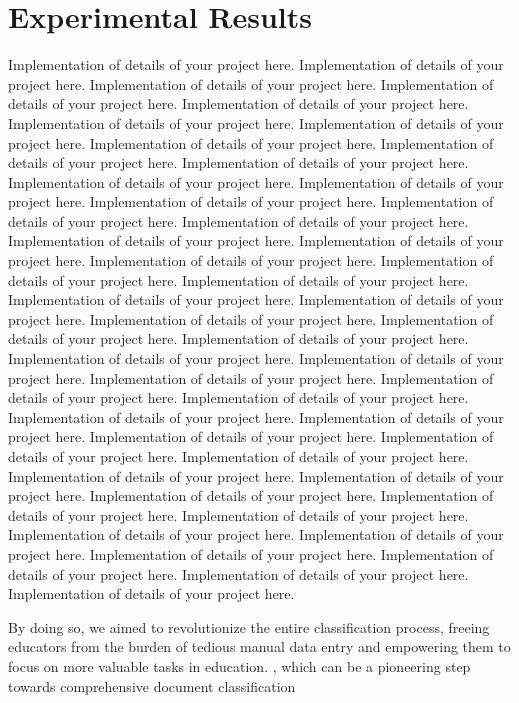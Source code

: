 \chapter{Experimental Results}


Implementation of details of  your project here. Implementation of details of  your project here. Implementation of details of  your project here. Implementation of details of  your project here. Implementation of details of  your project here. Implementation of details of  your project here. Implementation of details of  your project here. Implementation of details of  your project here. Implementation of details of  your project here. Implementation of details of  your project here. Implementation of details of  your project here. Implementation of details of  your project here. Implementation of details of  your project here. Implementation of details of  your project here. Implementation of details of  your project here. Implementation of details of  your project here. Implementation of details of  your project here. Implementation of details of  your project here. Implementation of details of  your project here. Implementation of details of  your project here. Implementation of details of  your project here. Implementation of details of  your project here. Implementation of details of  your project here. Implementation of details of  your project here. Implementation of details of  your project here. Implementation of details of  your project here. Implementation of details of  your project here. Implementation of details of  your project here. Implementation of details of  your project here. Implementation of details of  your project here. Implementation of details of  your project here. Implementation of details of  your project here. Implementation of details of  your project here. Implementation of details of  your project here. Implementation of details of  your project here. Implementation of details of  your project here. Implementation of details of  your project here. Implementation of details of  your project here. Implementation of details of  your project here. Implementation of details of  your project here. Implementation of details of  your project here. Implementation of details of  your project here. Implementation of details of  your project here. Implementation of details of  your project here. Implementation of details of  your project here. Implementation of details of  your project here. 

By doing so, we aimed to revolutionize the entire classification process, freeing educators from the burden of tedious manual data entry and empowering them to focus on more valuable tasks in education.
, which can be a pioneering step towards comprehensive document classification

